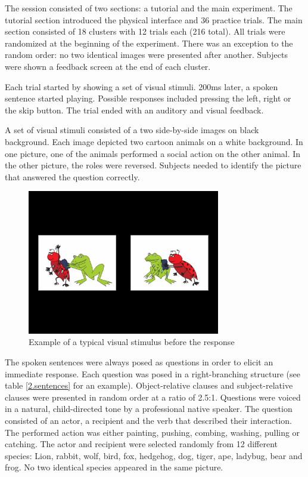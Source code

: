 The session consisted of two sections: a tutorial and the main experiment.
The tutorial section introduced the physical interface and 36 practice trials.
The main section consisted of 18 clusters with 12 trials each (216 total).
All trials were randomized at the beginning of the experiment.
There was an exception to the random order: no two identical images were presented after another.
Subjects were shown a feedback screen at the end of each cluster.

Each trial started by showing a set of visual stimuli.
200ms later, a spoken sentence started playing.
Possible responses included pressing the left, right or the skip button.
The trial ended with an auditory and visual feedback.

A set of visual stimuli consisted of a two side-by-side images on black background.
Each image depicted two cartoon animals on a white background.
In one picture, one of the animals performed a social action on the other animal.
In the other picture, the roles were reversed.
Subjects needed to identify the picture that answered the question correctly.

\begin{figure}[h]
\begin{center}
\vspace{7mm}
\includegraphics[width=0.75\textwidth]{pics/2_screen}
\caption{\label{2.screen} Example of a typical visual stimulus before the response}
\end{center}
\end{figure}

The spoken sentences were always posed as questions in order to elicit an immediate response.
Each question was posed in a right-branching structure (see table \ref{2.sentences} for an example).
Object-relative clauses and subject-relative clauses were presented in random order at a ratio of 2.5:1.
Questions were voiced in a natural, child-directed tone by a professional native speaker.
The question consisted of an actor, a recipient and the verb that described their interaction.
The performed action was either painting, pushing, combing, washing, pulling or catching.
The actor and recipient were selected randomly from 12 different species: Lion, rabbit, wolf, bird, fox, hedgehog, dog, tiger, ape, ladybug, bear and frog.
No two identical species appeared in the same picture.

